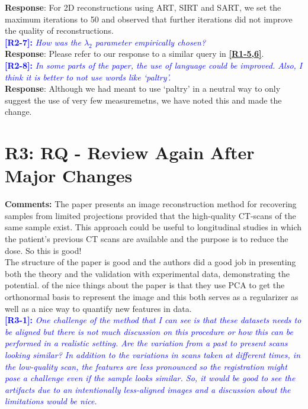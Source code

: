 \documentclass[11pt]{article}
\begin{document}
\textbf{Response}: For 2D reconstructions using ART, SIRT and SART, we set the maximum iterations to 50 and observed that further iterations did not improve the quality of reconstructions.\\

\vspace{0.5cm}\textcolor{blue}{\textbf{[R2-7]:} \textit{How was the $\lambda_2$ parameter empirically chosen?
}}\\

\textbf{Response}: Please refer to our response to a similar query in \textcolor{blue}{\textbf{\hyperlink{hyperparameters}{[R1-5,6]}}}.\\

\vspace{0.5cm}\textcolor{blue}{\textbf{[R2-8]:} \textit{In some parts of the paper, the use of language could be improved. Also, I think it is better to not use words like `paltry'.}}\\

\textbf{Response}: Although we had meant to use `paltry' in a neutral way to only suggest the use of very few measuremetns, we  have noted this and made the change.\\

\section{R3: RQ - Review Again After Major Changes}

\textbf{Comments:} The paper presents an image reconstruction method for recovering samples from limited projections provided that the high-quality CT-scans of the same sample exist. This approach could be useful to longitudinal studies in which the patient's previous CT scans are available and the purpose is to reduce the dose. So this is good!\\

The structure of the paper is good and the authors did a good job in presenting both the theory and the validation with experimental data, demonstrating the potential. of the nice things about the paper is that they use PCA to get the orthonormal basis to represent the image and this both serves as a regularizer as well as a nice way to quantify new features in data.
\\

\vspace{0.5cm}\textcolor{blue}{\textbf{[R3-1]:} \textit{One challenge of the method that I can see is that these datasets needs to be aligned but there is not much discussion on this procedure or how this can be performed in a realistic setting. Are the variation from a past to present scans looking similar? In addition to the variations in scans taken at different times, in the low-quality scan, the features are less pronounced so the registration might pose a challenge even if the sample looks similar. So, it would be good to see the artifacts due to an intentionally less-aligned images and a discussion about the limitations would be nice.
}}\\
\end{document}
